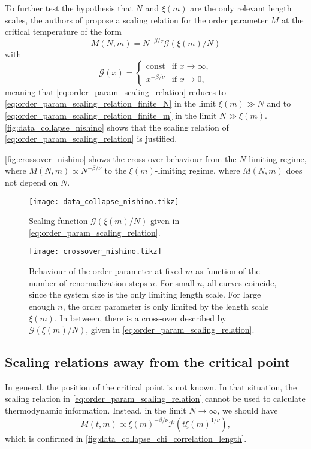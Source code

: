To further test the hypothesis that $N$ and $\xi(m)$ are the only relevant length scales,
the authors of \cite{nishino1996numerical} propose a scaling relation for the order
parameter $M$ at the critical temperature of the form
\begin{equation}\label{eq:order_param_scaling_relation}
  M(N, m) = N^{-\beta/\nu} \mathcal{G}(\xi(m) / N)
\end{equation}
with
\begin{equation}
  \mathcal{G}(x) =
  \begin{cases}
    \text{const} & \text{if } x \to \infty, \\
    x^{-\beta/\nu} & \text{if } x \to 0,
  \end{cases}
\end{equation}
meaning that \autoref{eq:order_param_scaling_relation} reduces to
\autoref{eq:order_param_scaling_relation_finite_N} in the limit $\xi(m) \gg N$ and to
\autoref{eq:order_param_scaling_relation_finite_m} in the limit $N \gg \xi(m)$.
\autoref{fig:data_collapse_nishino} shows that the scaling relation of \autoref{eq:order_param_scaling_relation}
is justified.

\autoref{fig:crossover_nishino} shows the cross-over behaviour from the $N$-limiting regime, where
$M(N, m) \propto N^{-\beta/\nu}$ to the $\xi(m)$-limiting regime, where $M(N, m)$ does not depend on $N$.

\begin{figure}
  \texttt{[image: data\_collapse\_nishino.tikz]}
  \caption{Scaling function $\mathcal{G}(\xi(m)/N)$ given in
  \autoref{eq:order_param_scaling_relation}.}\label{fig:data_collapse_nishino}
\end{figure}

\begin{figure}
  \texttt{[image: crossover\_nishino.tikz]}
  \caption{Behaviour of the order parameter at fixed $m$ as function of
  the number of renormalization steps $n$. For small $n$, all curves coincide, since the system size is the only
  limiting length scale. For large enough $n$, the order parameter is only limited by the length scale
  $\xi(m)$. In between, there is a cross-over described by $\mathcal{G}(\xi(m)/N)$, given in
  \autoref{eq:order_param_scaling_relation}.}\label{fig:crossover_nishino}
\end{figure}

\subsection{Scaling relations away from the critical point}
In general, the position of the critical point is not known. In that situation, the scaling relation in
\autoref{eq:order_param_scaling_relation} cannot be used to calculate thermodynamic information. Instead, in the limit
$N \to \infty$, we should have
\begin{equation}\label{eq:order_param_scaling_relation_finite_chi_t}
  M(t, m) \propto \xi(m)^{-\beta/\nu}\mathcal{P}(t \xi(m)^{1/\nu}),
\end{equation}
which is confirmed in \autoref{fig:data_collapse_chi_correlation_length}.

